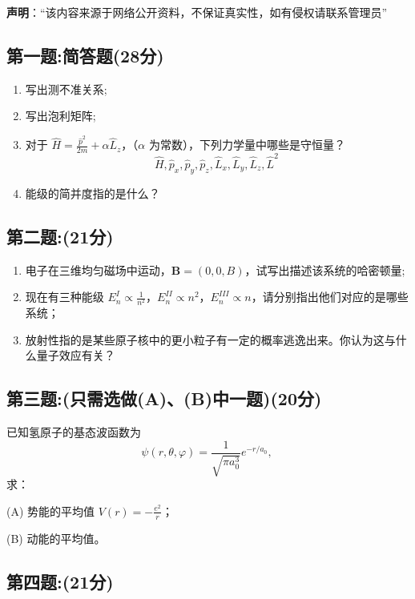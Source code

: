 
\textbf{声明}：“该内容来源于网络公开资料，不保证真实性，如有侵权请联系管理员”

\subsection{第一题:简答题(28分)}
\begin{enumerate}
    \item 写出测不准关系;
    \item 写出泡利矩阵;
    \item 对于 $\hat{H} = \frac{\hat{p}^2}{2m} + \alpha \hat{L}_z$，（$\alpha$ 为常数），下列力学量中哪些是守恒量？
    \[    \hat{H}, \hat{p}_x, \hat{p}_y, \hat{p}_z, \hat{L}_x, \hat{L}_y, \hat{L}_z, \hat{L}^2 ~\]
    \item 能级的简并度指的是什么？
\end{enumerate}
\subsection{第二题:(21分)}
\begin{enumerate}
    \item 电子在三维均匀磁场中运动，$\mathbf{B} = (0, 0, B)$，试写出描述该系统的哈密顿量;
    \item 现在有三种能级 $E_n^I \propto \frac{1}{n^2}$，$E_n^{II} \propto n^2$，$E_n^{III} \propto n$，请分别指出他们对应的是哪些系统；
    \item 放射性指的是某些原子核中的更小粒子有一定的概率逃逸出来。你认为这与什么量子效应有关？
\end{enumerate}
\subsection{第三题:(只需选做(A)、(B)中一题)(20分)}
已知氢原子的基态波函数为
\[\psi(r, \theta, \varphi) = \frac{1}{\sqrt{\pi a_0^3}} e^{-r/a_0},~\]
求：

(A) 势能的平均值 \(V(r) = -\frac{e^2}{r}\)；

(B) 动能的平均值。
\subsection{第四题:(21分)}
